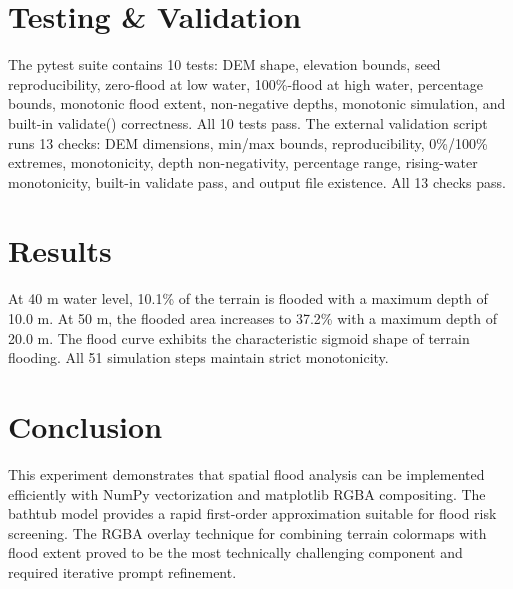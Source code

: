 \documentclass[12pt,a4paper]{article}
\begin{document}
\section{Testing \& Validation}
The pytest suite contains 10 tests: DEM shape, elevation bounds, seed reproducibility, zero-flood at low water, 100\%-flood at high water, percentage bounds, monotonic flood extent, non-negative depths, monotonic simulation, and built-in validate() correctness. All 10 tests pass. The external validation script runs 13 checks: DEM dimensions, min/max bounds, reproducibility, 0\%/100\% extremes, monotonicity, depth non-negativity, percentage range, rising-water monotonicity, built-in validate pass, and output file existence. All 13 checks pass.

\section{Results}
At 40 m water level, 10.1\% of the terrain is flooded with a maximum depth of 10.0 m. At 50 m, the flooded area increases to 37.2\% with a maximum depth of 20.0 m. The flood curve exhibits the characteristic sigmoid shape of terrain flooding. All 51 simulation steps maintain strict monotonicity.

\section{Conclusion}
This experiment demonstrates that spatial flood analysis can be implemented efficiently with NumPy vectorization and matplotlib RGBA compositing. The bathtub model provides a rapid first-order approximation suitable for flood risk screening. The RGBA overlay technique for combining terrain colormaps with flood extent proved to be the most technically challenging component and required iterative prompt refinement.
\end{document}
